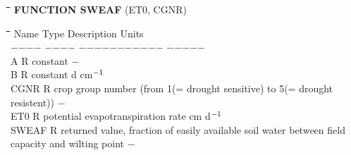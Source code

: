 \documentclass[11pt]{article}
\begin{document}
\bigskip
\nwln
\begin{tabbing}
\hspace{1.27cm}\=\hspace{1.27cm}\=\hspace{1.27cm}\=\hspace{1.27cm}\=%
\hspace{1.27cm}\=\hspace{1.27cm}\=\hspace{1.27cm}\=\hspace{1.27cm}\=%
\hspace{1.27cm}\=\hspace{1.27cm}\=\kill
{\bf FUNCTION SWEAF}\> \> \> (ET0, CGNR)
\end{tabbing}
\nwln
\begin{tabbing}
\hspace{1.27cm}\=\hspace{1.27cm}\=\hspace{1.27cm}\=\hspace{1.27cm}\=%
\hspace{1.27cm}\=\hspace{1.27cm}\=\hspace{1.27cm}\=\hspace{1.27cm}\=%
\hspace{1.27cm}\=\hspace{1.27cm}\=\kill
Name    \> \> Type   \> Description                                        \> \> \> \> \> \> \> Units\\
$-$$-$$-$$-$    \> \> $-$$-$$-$$-$   \> $-$$-$$-$$-$$-$$-$$-$$-$$-$$-$$-$                                        \> \> \> \> \> \> \> $-$$-$$-$$-$$-$\\
A       \> \> R   \> constant                                           \> \> \> \> \> \> \> $-$\\
B       \> \> R   \> constant                                           \> \> \> \> \> \> \> d cm$^{{\rm -1}}$\\
CGNR    \> \> R   \> crop group number (from 1(= drought sensitive) to 5(= drought resistent))   \> \> \> \> \> \> \> $-$  \\
ET0     \> \> R   \> potential evapotranspiration rate                  \> \> \> \> \> \> \> cm d$^{{\rm -1}}$ \\
SWEAF   \> \> R   \> returned value, fraction of easily available soil water between field \\
\>\> \> capacity and wilting point                                      \> \> \> \> \> \> \> $-$
\end{tabbing}
\end{document}
